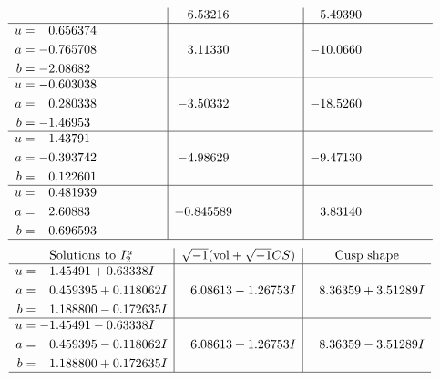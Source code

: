 \documentclass[1p]{elsarticle_modified}
\theoremstyle{definition}
\newcommand{\I}{\sqrt{-1}}
\begin{document}
$$\begin{array}{c|c|c}
 & -6.53216\phantom{ +0.000000I} & \phantom{-}5.49390\phantom{ +0.000000I} \\ \hline\begin{aligned}
u &= \phantom{-}0.656374\phantom{ +0.000000I} \\
a &= -0.765708\phantom{ +0.000000I} \\
b &= -2.08682\phantom{ +0.000000I}\end{aligned}
 & \phantom{-}3.11330\phantom{ +0.000000I} & -10.0660\phantom{ +0.000000I} \\ \hline\begin{aligned}
u &= -0.603038\phantom{ +0.000000I} \\
a &= \phantom{-}0.280338\phantom{ +0.000000I} \\
b &= -1.46953\phantom{ +0.000000I}\end{aligned}
 & -3.50332\phantom{ +0.000000I} & -18.5260\phantom{ +0.000000I} \\ \hline\begin{aligned}
u &= \phantom{-}1.43791\phantom{ +0.000000I} \\
a &= -0.393742\phantom{ +0.000000I} \\
b &= \phantom{-}0.122601\phantom{ +0.000000I}\end{aligned}
 & -4.98629\phantom{ +0.000000I} & -9.47130\phantom{ +0.000000I} \\ \hline\begin{aligned}
u &= \phantom{-}0.481939\phantom{ +0.000000I} \\
a &= \phantom{-}2.60883\phantom{ +0.000000I} \\
b &= -0.696593\phantom{ +0.000000I}\end{aligned}
 & -0.845589\phantom{ +0.000000I} & \phantom{-}3.83140\phantom{ +0.000000I}\\
 \hline 
 \end{array}$$\newpage$$\begin{array}{c|c|c}  
\text{Solutions to }I^u_{2}& \I (\text{vol} + \sqrt{-1}CS) & \text{Cusp shape}\\
 \hline 
\begin{aligned}
u &= -1.45491 + 0.63338 I \\
a &= \phantom{-}0.459395 + 0.118062 I \\
b &= \phantom{-}1.188800 - 0.172635 I\end{aligned}
 & \phantom{-}6.08613 - 1.26753 I & \phantom{-}8.36359 + 3.51289 I \\ \hline\begin{aligned}
u &= -1.45491 - 0.63338 I \\
a &= \phantom{-}0.459395 - 0.118062 I \\
b &= \phantom{-}1.188800 + 0.172635 I\end{aligned}
 & \phantom{-}6.08613 + 1.26753 I & \phantom{-}8.36359 - 3.51289 I\\
 \hline 
 \end{array}$$\newpage
\end{document}
